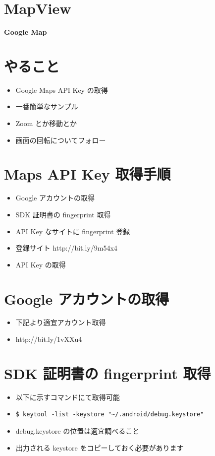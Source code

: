 \documentclass[slide,papersize]{jsarticle}
\begin{document}
\section*{MapView}
\vspace*{15mm}
\begin{center}
{\Huge {\bf Google Map}}
\end{center}

\section*{やること}
\bigskip
\begin{itemize}
\item Google Maps API Key の取得
\bigskip
\item 一番簡単なサンプル
\bigskip
\item Zoom とか移動とか
\bigskip
\item 画面の回転についてフォロー
\end{itemize}

\section*{Maps API Key 取得手順}
\medskip
\begin{itemize}
\item Google アカウントの取得
\medskip
\item SDK 証明書の fingerprint 取得
\medskip
\item API Key なサイトに fingerprint 登録
\medskip
\item 登録サイト http://bit.ly/9m54x4
\medskip
\item API Key の取得
\end{itemize}

\section*{Google アカウントの取得}
\bigskip
\begin{itemize}
\item 下記より適宜アカウント取得
\bigskip
\item http://bit.ly/1vXXu4
\end{itemize}


\section*{SDK 証明書の fingerprint 取得}
\bigskip
\begin{itemize}
\item 以下に示すコマンドにて取得可能
\bigskip
\item {\scriptsize \begin{verbatim}$ keytool -list -keystore "~/.android/debug.keystore" \end{verbatim}}
\bigskip
\item debug.keystore の位置は適宜調べること
\bigskip
\item 出力される keystore をコピーしておく必要があります
\end{itemize}
\end{document}
